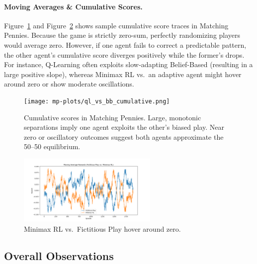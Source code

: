 \documentclass[11pt]{article}
\begin{document}
\paragraph{Moving Averages \& Cumulative Scores.}
Figure~\ref{fig:mp-ql-bb-cumulative} and Figure~\ref{fig:mp-fp-mm-rewards} shows sample cumulative score traces in 
Matching Pennies. Because the game is strictly zero-sum, perfectly 
randomizing players would average zero. However, if one agent fails to 
correct a predictable pattern, the other agent’s cumulative score 
diverges positively while the former’s drops. For instance, Q-Learning 
often exploits slow‐adapting Belief-Based (resulting in a large positive 
slope), whereas Minimax RL vs.\ an adaptive agent might hover around 
zero or show moderate oscillations.

\begin{figure}[htbp]
    \centering
    \texttt{[image: mp-plots/ql\_vs\_bb\_cumulative.png]}
    \caption{Cumulative scores in Matching Pennies. Large, monotonic 
    separations imply one agent exploits the other's biased play. Near 
    zero or oscillatory outcomes suggest both agents approximate the 
    50--50 equilibrium.}
    \label{fig:mp-ql-bb-cumulative}
\end{figure}

\begin{figure}[htbp]
    \centering
    \includegraphics[width=0.6\textwidth]{mp-plots/fp_vs_mm_rewards.png}
    \caption{Minimax RL vs.\ Fictitious Play hover around 
    zero.}
    \label{fig:mp-fp-mm-rewards}
\end{figure}

\subsection{Overall Observations}
\end{document}
